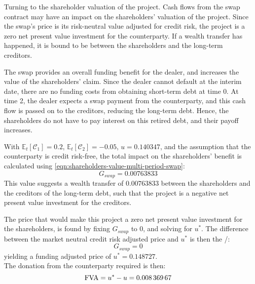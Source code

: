 \documentclass[main.tex]{subfiles}
\begin{document}
            Turning to the shareholder valuation of the project.
            Cash flows from the swap contract may have an impact on the shareholders' valuation of the project.
            Since the swap's price is its risk-neutral value adjusted for credit risk,
            the project is a zero net present value investment for the counterparty.
            If a wealth transfer has happened, it is bound to be between the shareholders and the long-term creditors.

           The swap provides an overall funding benefit for the dealer,
            and increases the value of the shareholders' claim.
            Since the dealer cannot default at the interim date,
            there are no funding costs from obtaining short-term debt at time 0.
            At time 2, the dealer expects a swap payment from the counterparty,
            and this cash flow is passed on to the creditors, reducing the long-term debt.
            Hence, the shareholders do not have to pay interest on this retired debt,
            and their payoff increases.
            
            With $\mathbb{E}_{t}\left[\mathcal{C}_1\right]=\num{0.2}$,
            $\mathbb{E}_{t}\left[\mathcal{C}_2\right]=\num{-0.05}$,
            $u=\num{0.140347}$,
            and the assumption that the counterparty is credit risk-free,
            the total impact on the shareholders' benefit is calculated using \cref{eqn:shareholders-value-multi-period-swap}:
            \begin{equation}
                G_{swap} = \num{0.00763833}
            \end{equation}
            This value suggests a wealth transfer of $\num{0.00763833}$
            between the shareholders and the creditors of the long-term debt,
            such that the project is a negative net present value investment for the creditors.

            The price that would make this project a zero net present value investment for the shareholders,
            is found by fixing $G_{swap}$ to 0,
            and solving for $u^{\ast}$.
            The difference between the market neutral credit risk adjusted price and $u^{\ast}$ is then the \FVA/:
            \begin{equation}
                G_{swap} = 0
            \end{equation}
            yielding a funding adjusted price of $u^{\ast} = \num{0.148727}$.
            \\
            The donation from the counterparty required is then:
            \begin{equation}
                \FVA/ = u^{\ast} - u = \num{0.00836967}
            \end{equation}
\end{document}
